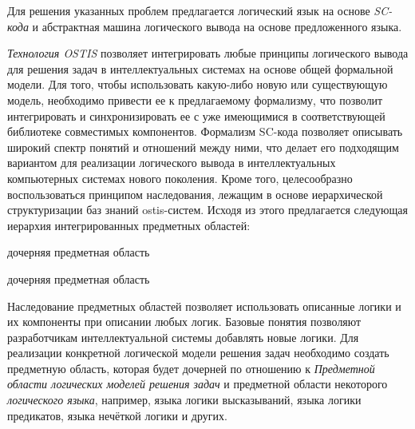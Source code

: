 Для решения указанных проблем предлагается логический язык на основе \textit{SC-кода} и абстрактная машина логического вывода на основе предложенного языка. 

\textit{Технология OSTIS} позволяет интегрировать любые принципы логического вывода для решения задач в интеллектуальных системах на основе общей формальной модели. Для того, чтобы использовать какую-либо новую или существующую модель, необходимо привести ее к предлагаемому формализму, что позволит интегрировать и синхронизировать ее с уже имеющимися в соответствующей библиотеке совместимых компонентов. Формализм SC-кода позволяет описывать широкий спектр понятий и отношений между ними, что делает его подходящим вариантом для реализации логического вывода в интеллектуальных компьютерных системах нового поколения. Кроме того, целесообразно воспользоваться принципом наследования, лежащим в основе иерархической структуризации баз знаний ostis-систем. Исходя из этого предлагается следующая иерархия интегрированных предметных областей:

\begin{SCn}
	\begin{scnrelfromlist}{дочерняя предметная область}
	\end{scnrelfromlist}
	
	\begin{scnindent}
	\end{scnindent}
	
	\begin{scnreltolist}{дочерняя предметная область}
	\end{scnreltolist}
\end{SCn}

Наследование предметных областей позволяет использовать описанные логики и их компоненты при описании любых логик. Базовые понятия позволяют разработчикам интеллектуальной системы добавлять новые логики. Для реализации конкретной логической модели решения задач необходимо создать предметную область, которая будет дочерней по отношению к \textit{Предметной области логических моделей решения задач} и предметной области некоторого \textit{логического языка}, например, языка логики высказываний, языка логики предикатов, языка нечёткой логики и других.

